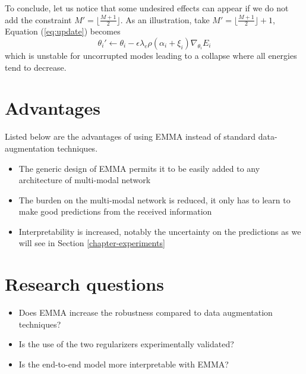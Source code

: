 To conclude, let us notice that some undesired effects can appear if we do not add the constraint $M' = \lfloor \frac{M+1}{2} \rfloor$. As an illustration, take $M' = \lfloor \frac{M+1}{2} \rfloor + 1$, Equation (\ref{eq:update}) becomes
\begin{equation}
\theta_i' \leftarrow \theta_i - \epsilon\lambda_e\rho(\alpha_i + \xi_i)\nabla_{\theta_i}E_i
\end{equation}
which is unstable for uncorrupted modes leading to a collapse where all energies tend to decrease.


\section{Advantages}
Listed below are the advantages of using EMMA instead of standard data-augmentation techniques.
\begin{itemize}
\item The generic design of EMMA permits it to be easily added to any architecture of multi-modal network
\item The burden on the multi-modal network is reduced, it only has to learn to make good predictions from the received information
\item Interpretability is increased, notably the uncertainty on the predictions as we will see in Section \ref{chapter-experiments}
\end{itemize}


\section{Research questions}
\begin{itemize}
\item Does EMMA increase the robustness compared to data augmentation techniques?
\item Is the use of the two regularizers experimentally validated?
\item Is the end-to-end model more interpretable with EMMA?
\end{itemize}

